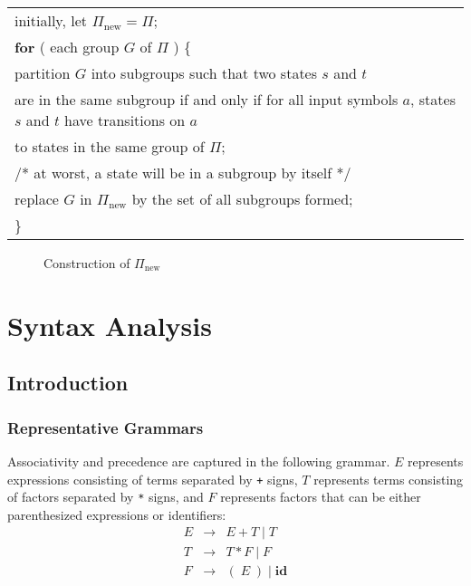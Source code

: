 \documentclass[12pt,a4paper,twoside,openany]{book}
\begin{document}
\begin{center}
    \begin{tabular}{l}
        initially, let $\Pi_{\text{new}}=\Pi$;\\
        \textbf{for} ( each group $G$ of $\Pi$ ) \{\\
        \qquad partition $G$ into subgroups such that two states $s$ and $t$\\
        \qquad\qquad are in the same subgroup if and only if for all input symbols $a$, states $s$ and $t$ have transitions on $a$\\
        \qquad\qquad to states in the same group of $\Pi$;\\
        \qquad/* at worst, a state will be in a subgroup by itself */\\
        \qquad replace $G$ in $\Pi_{\text{new}}$ by the set of all subgroups formed;\\
        \}
    \end{tabular}
\end{center}
\begin{figure}[htbp]
    \caption{Construction of $\Pi_{\text{new}}$}
    \label{Figure:3.64}
\end{figure}

\chapter{Syntax Analysis}
\section{Introduction}
\subsection{Representative Grammars}

Associativity and precedence are captured in the following grammar. $E$ represents expressions consisting of terms separated by \verb|+| signs, $T$ represents terms consisting of factors separated by \verb|*| signs, and $F$ represents factors that can be either parenthesized expressions or identifiers:
\begin{equation}
    \begin{array}{ccc}E&\rightarrow&E+T\;|\;T\\T&\rightarrow&T*F\;|\;F\\F&\rightarrow&(\;E\;)\;|\;\textbf{id}\end{array}
    \label{4.1}
\end{equation}
\end{document}
